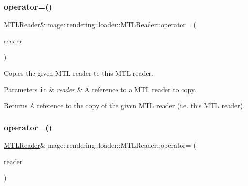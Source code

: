 \subsubsection{\texorpdfstring{operator=()}{operator=()}\hspace{0.1cm}{\footnotesize\ttfamily [1/2]}}
{\footnotesize\ttfamily \hyperlink{classmage_1_1rendering_1_1loader_1_1_m_t_l_reader}{M\+T\+L\+Reader}\& mage\+::rendering\+::loader\+::\+M\+T\+L\+Reader\+::operator= (\begin{DoxyParamCaption}\item[{const \hyperlink{classmage_1_1rendering_1_1loader_1_1_m_t_l_reader}{M\+T\+L\+Reader} \&}]{reader }\end{DoxyParamCaption})\hspace{0.3cm}{\ttfamily [delete]}}

Copies the given M\+TL reader to this M\+TL reader.


\begin{DoxyParams}[1]{Parameters}
\mbox{\tt in}  & {\em reader} & A reference to a M\+TL reader to copy. \\
\hline
\end{DoxyParams}
\begin{DoxyReturn}{Returns}
A reference to the copy of the given M\+TL reader (i.\+e. this M\+TL reader). 
\end{DoxyReturn}
\hypertarget{classmage_1_1rendering_1_1loader_1_1_m_t_l_reader_a057f38f1f720e040b2ab5fa08f42fac4}{}\label{classmage_1_1rendering_1_1loader_1_1_m_t_l_reader_a057f38f1f720e040b2ab5fa08f42fac4} 
\subsubsection{\texorpdfstring{operator=()}{operator=()}\hspace{0.1cm}{\footnotesize\ttfamily [2/2]}}
{\footnotesize\ttfamily \hyperlink{classmage_1_1rendering_1_1loader_1_1_m_t_l_reader}{M\+T\+L\+Reader}\& mage\+::rendering\+::loader\+::\+M\+T\+L\+Reader\+::operator= (\begin{DoxyParamCaption}\item[{\hyperlink{classmage_1_1rendering_1_1loader_1_1_m_t_l_reader}{M\+T\+L\+Reader} \&\&}]{reader }\end{DoxyParamCaption})\hspace{0.3cm}{\ttfamily [delete]}}


